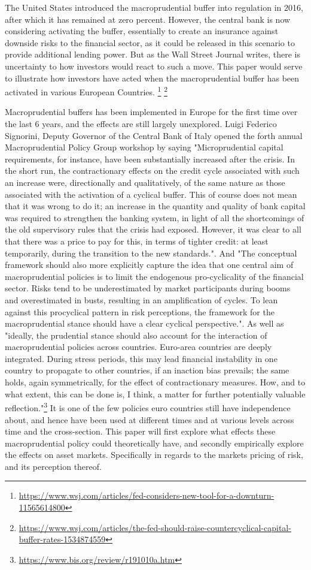 \documentclass[11pt]{article}
\begin{document}
The United States introduced the macroprudential buffer into regulation in 2016, after which it has remained at zero percent. However, the central bank is now considering activating the buffer, essentially to create an insurance against downside risks to the financial sector, as it could be released in this scenario to provide additional lending power. But as the Wall Street Journal writes, there is uncertainty to how investors would react to such a move. This paper would serve to illustrate how investors have acted when the macroprudential buffer has been activated in various European Countries. \footnote{
\url{https://www.wsj.com/articles/fed-considers-new-tool-for-a-downturn-11565614800}} \footnote{
\url{https://www.wsj.com/articles/the-fed-should-raise-countercyclical-capital-buffer-rates-1534874559}}

Macroprudential buffers has been implemented in Europe for the first time over the last 6 years, and the effects are still largely unexplored. Luigi Federico Signorini, Deputy Governor of the Central Bank of Italy opened the forth annual Macroprudential Policy Group workshop by saying "Microprudential capital requirements, for instance, have been substantially increased after the crisis. In the short run, the contractionary effects on the credit cycle associated with such an increase were, directionally and qualitatively, of the same nature as those associated with the activation of a cyclical buffer. This of course does not mean that it was wrong to do it; an increase in the quantity and quality of bank capital was required to strengthen the banking system, in light of all the shortcomings of the old supervisory rules that the crisis had exposed. However, it was clear to all that there was a price to pay for this, in terms of tighter credit: at least temporarily, during the transition to the new standards.". And "The conceptual framework should also more explicitly capture the idea that one central aim of macroprudential policies is to limit the endogenous pro-cyclicality of the financial sector. Risks tend to be underestimated by market participants during booms and overestimated in busts, resulting in an amplification of cycles. To lean against this procyclical pattern in risk perceptions, the framework for the macroprudential stance should have a clear cyclical perspective.". As well as "ideally, the prudential stance should also account for the interaction of macroprudential policies across countries. Euro-area countries are deeply integrated. During stress periods, this may lead financial instability in one country to propagate to other countries, if an inaction bias prevails; the same holds, again symmetrically, for the effect of contractionary measures. How, and to what extent, this can be done is, I think, a matter for further potentially valuable reflection."\footnote{\url{https://www.bis.org/review/r191010a.htm}} It is one of the few policies euro countries still have independence about, and hence have been used at different times and at various levels across time and the cross-section. This paper will first explore what effects these macroprudential policy could theoretically have, and secondly empirically explore the effects on asset markets. Specifically in regards to the markets pricing of risk, and its perception thereof.
\end{document}
